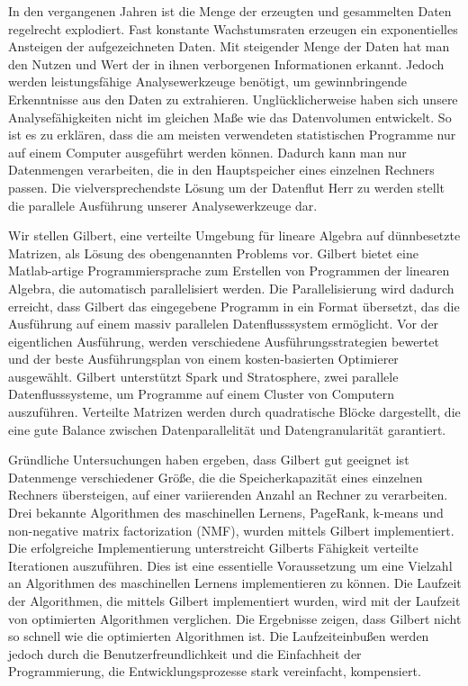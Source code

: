 \clearemptydoublepage
{}
{}	


\vspace*{2cm}
\begin{center}
\end{center}
\vspace{1cm}

In den vergangenen Jahren ist die Menge der erzeugten und gesammelten Daten regelrecht explodiert.
Fast konstante Wachstumsraten erzeugen ein exponentielles Ansteigen der aufgezeichneten Daten.
Mit steigender Menge der Daten hat man den Nutzen und Wert der in ihnen verborgenen Informationen erkannt.
Jedoch werden leistungsfähige Analysewerkzeuge benötigt, um gewinnbringende Erkenntnisse aus den Daten zu extrahieren.
Unglücklicherweise haben sich unsere Analysefähigkeiten nicht im gleichen Maße wie das Datenvolumen entwickelt.
So ist es zu erklären, dass die am meisten verwendeten statistischen Programme nur auf einem Computer ausgeführt werden können.
Dadurch kann man nur Datenmengen verarbeiten, die in den Hauptspeicher eines einzelnen Rechners passen.
Die vielversprechendste Lösung um der Datenflut Herr zu werden stellt die parallele Ausführung unserer Analysewerkzeuge dar.

Wir stellen Gilbert, eine verteilte Umgebung für lineare Algebra auf dünnbesetzte Matrizen, als Lösung des obengenannten Problems vor.
Gilbert bietet eine Matlab-artige Programmiersprache zum Erstellen von Programmen der linearen Algebra, die automatisch parallelisiert werden.
Die Parallelisierung wird dadurch erreicht, dass Gilbert das eingegebene Programm in ein Format übersetzt, das die Ausführung auf einem massiv parallelen Datenflusssystem ermöglicht.
Vor der eigentlichen Ausführung, werden verschiedene Ausführungsstrategien bewertet und der beste Ausführungsplan von einem kosten-basierten Optimierer ausgewählt.
Gilbert unterstützt Spark und Stratosphere, zwei parallele Datenflusssysteme, um Programme auf einem Cluster von Computern auszuführen.
Verteilte Matrizen werden durch quadratische Blöcke dargestellt, die eine gute Balance zwischen Datenparallelität und Datengranularität garantiert.

Gründliche Untersuchungen haben ergeben, dass Gilbert gut geeignet ist Datenmenge verschiedener Größe, die die Speicherkapazität eines einzelnen Rechners übersteigen, auf einer variierenden Anzahl an Rechner zu verarbeiten.
Drei bekannte Algorithmen des maschinellen Lernens, PageRank, k-means und non-negative matrix factorization (NMF), wurden mittels Gilbert implementiert.
Die erfolgreiche Implementierung unterstreicht Gilberts Fähigkeit verteilte Iterationen auszuführen.
Dies ist eine essentielle Voraussetzung um eine Vielzahl an Algorithmen des maschinellen Lernens implementieren zu können.
Die Laufzeit der Algorithmen, die mittels Gilbert implementiert wurden, wird mit der Laufzeit von optimierten Algorithmen verglichen.
Die Ergebnisse zeigen, dass Gilbert nicht so schnell wie die optimierten Algorithmen ist.
Die Laufzeiteinbußen werden jedoch durch die Benutzerfreundlichkeit und die Einfachheit der Programmierung, die Entwicklungsprozesse stark vereinfacht, kompensiert.